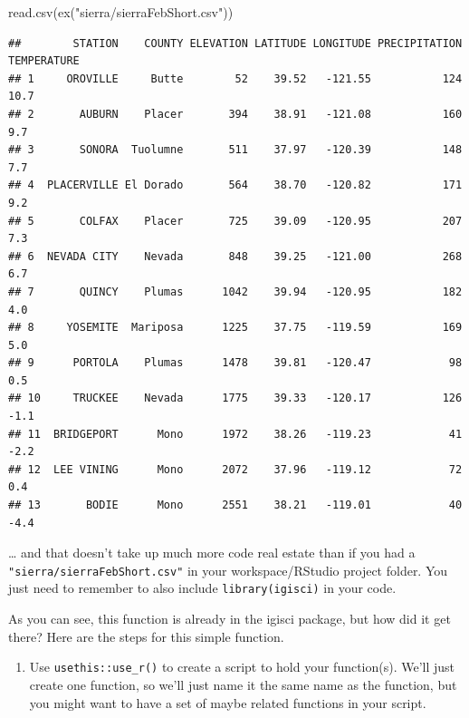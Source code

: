 \documentclass[
]{book}
\newenvironment{Shaded}{\begin{snugshade}}{\end{snugshade}}
\newcommand{\FunctionTok}[1]{\textcolor[rgb]{0,0,0}{#1}}
\newcommand{\NormalTok}[1]{#1}
\newcommand{\StringTok}[1]{\textcolor[rgb]{0.5,0.5,0.5}{#1}}
\providecommand{\tightlist}{%
  \setlength{\itemsep}{0pt}\setlength{\parskip}{0pt}}
\begin{document}
\begin{Shaded}
\begin{Highlighting}[]
\FunctionTok{read.csv}\NormalTok{(}\FunctionTok{ex}\NormalTok{(}\StringTok{"sierra/sierraFebShort.csv"}\NormalTok{))}
\end{Highlighting}
\end{Shaded}

\begin{verbatim}
##        STATION    COUNTY ELEVATION LATITUDE LONGITUDE PRECIPITATION TEMPERATURE
## 1     OROVILLE     Butte        52    39.52   -121.55           124        10.7
## 2       AUBURN    Placer       394    38.91   -121.08           160         9.7
## 3       SONORA  Tuolumne       511    37.97   -120.39           148         7.7
## 4  PLACERVILLE El Dorado       564    38.70   -120.82           171         9.2
## 5       COLFAX    Placer       725    39.09   -120.95           207         7.3
## 6  NEVADA CITY    Nevada       848    39.25   -121.00           268         6.7
## 7       QUINCY    Plumas      1042    39.94   -120.95           182         4.0
## 8     YOSEMITE  Mariposa      1225    37.75   -119.59           169         5.0
## 9      PORTOLA    Plumas      1478    39.81   -120.47            98         0.5
## 10     TRUCKEE    Nevada      1775    39.33   -120.17           126        -1.1
## 11  BRIDGEPORT      Mono      1972    38.26   -119.23            41        -2.2
## 12  LEE VINING      Mono      2072    37.96   -119.12            72         0.4
## 13       BODIE      Mono      2551    38.21   -119.01            40        -4.4
\end{verbatim}

\ldots{} and that doesn't take up much more code real estate than if you had a \texttt{"sierra/sierraFebShort.csv"} in your workspace/RStudio project folder. You just need to remember to also include \texttt{library(igisci)} in your code.

As you can see, this function is already in the igisci package, but how did it get there? Here are the steps for this simple function.

\begin{enumerate}
\def\labelenumi{\arabic{enumi}.}
\tightlist
\item
  Use \texttt{usethis::use\_r()} to create a script to hold your function(s). We'll just create one function, so we'll just name it the same name as the function, but you might want to have a set of maybe related functions in your script.
\end{enumerate}
\end{document}
